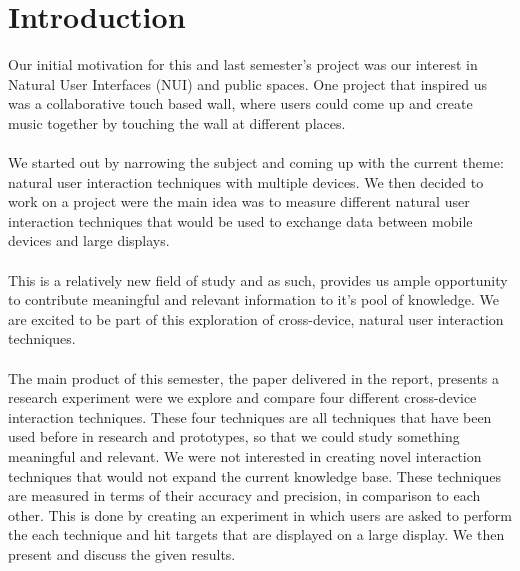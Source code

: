 \section*{Introduction}\label{sec:introduction}

Our initial motivation for this and last semester's project was our interest in Natural User Interfaces (NUI) and public spaces.
One project that inspired us was a collaborative touch based wall, where users could come up and create music together by touching the wall at different places.
\\ \\
We started out by narrowing the subject and coming up with the current theme: natural user interaction techniques with multiple devices. 
We then decided to work on a project were the main idea was to measure different natural user interaction techniques that would be used to exchange data between mobile devices and large displays. 
\\ \\
This is a relatively new field of study and as such, provides us ample opportunity to contribute meaningful and relevant information to it's pool of knowledge. 
We are excited to be part of this exploration of cross-device, natural user interaction techniques. 
\\ \\
The main product of this semester, the paper delivered in the report, presents a research experiment were we explore and compare four different cross-device interaction techniques. 
These four techniques are all techniques that have been used before in research and prototypes, so that we could study something meaningful and relevant.
We were not interested in creating novel interaction techniques that would not expand the current knowledge base.
These techniques are measured in terms of their accuracy and precision, in comparison to each other.
This is done by creating an experiment in which users are asked to perform the each technique and hit targets that are displayed on a large display.
We then present and discuss the given results. 

